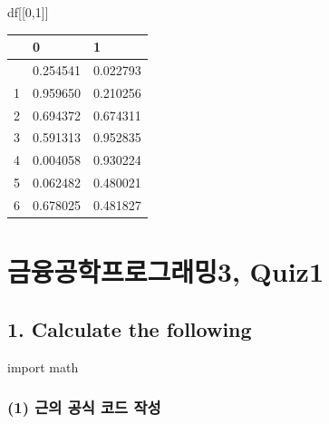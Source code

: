 \documentclass[
  a4paper,
  DIV=11,
  numbers=noendperiod]{scrreprt}
\newenvironment{Shaded}{\begin{snugshade}}{\end{snugshade}}
\newcommand{\DecValTok}[1]{\textcolor[rgb]{0.68,0.00,0.00}{#1}}
\newcommand{\ImportTok}[1]{\textcolor[rgb]{0.00,0.46,0.62}{#1}}
\newcommand{\NormalTok}[1]{\textcolor[rgb]{0.00,0.23,0.31}{#1}}
\begin{document}
\begin{Shaded}
\begin{Highlighting}[]
\NormalTok{df[[}\DecValTok{0}\NormalTok{,}\DecValTok{1}\NormalTok{]]}
\end{Highlighting}
\end{Shaded}

\begin{longtable}[]{@{}lll@{}}
\toprule\noalign{}
& 0 & 1 \\
\midrule\noalign{}
\endhead
\bottomrule\noalign{}
\endlastfoot
0 & 0.254541 & 0.022793 \\
1 & 0.959650 & 0.210256 \\
2 & 0.694372 & 0.674311 \\
3 & 0.591313 & 0.952835 \\
4 & 0.004058 & 0.930224 \\
5 & 0.062482 & 0.480021 \\
6 & 0.678025 & 0.481827 \\
\end{longtable}

\chapter*{금융공학프로그래밍3,
Quiz1}\label{uxae08uxc735uxacf5uxd559uxd504uxb85cuxadf8uxb798uxbc0d3-quiz1}


\section*{1. Calculate the following}\label{calculate-the-following}


\begin{Shaded}
\begin{Highlighting}[]
\ImportTok{import}\NormalTok{ math}
\end{Highlighting}
\end{Shaded}

\subsection*{(1) 근의 공식 코드
작성}\label{uxadfcuxc758-uxacf5uxc2dd-uxcf54uxb4dc-uxc791uxc131}
\end{document}
